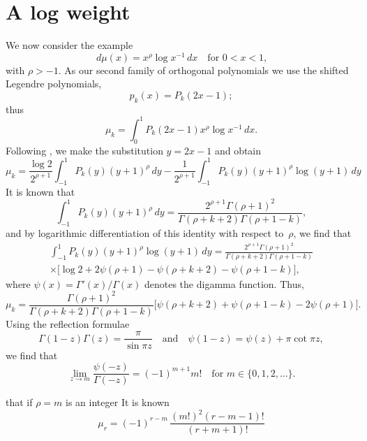 \documentclass[12pt,a4paper]{article}
\begin{document}
\section{A log weight}
We now consider the example
\[
d\mu(x)=x^\rho\log x^{-1}\,dx\quad\text{for $0<x<1$,}
\]
with $\rho>-1$.  As our second family of orthogonal polynomials we 
use the shifted Legendre polynomials,
\[
p_k(x)=P_k(2x-1);
\]
thus
\[
\mu_k=\int_0^1 P_k(2x-1)x^\rho\log x^{-1}\,dx.
\]
Following \cite{Gautschi1979}, we make the substitution $y=2x-1$
and obtain
\[
\mu_k=\frac{\log 2}{2^{\rho+1}}\int_{-1}^1 P_k(y)(y+1)^\rho\,dy
	-\frac{1}{2^{\rho+1}}\int_{-1}^1 
		P_k(y)(y+1)^\rho\log(y+1)\,dy
\]
It is known that
\[
\int_{-1}^1 P_k(y)(y+1)^\rho\,dy
	=\frac{2^{\rho+1}\Gamma(\rho+1)^2}%
{\Gamma(\rho+k+2)\Gamma(\rho+1-k)},
\]
and by logarithmic differentiation of this identity with respect 
to~$\rho$, we find that
\begin{multline*}
\int_{-1}^1 P_k(y)(y+1)^\rho\log(y+1)\,dy
	=\frac{2^{\rho+1}\Gamma(\rho+1)^2}%
{\Gamma(\rho+k+2)\Gamma(\rho+1-k)}\\
	\times\bigl[\log2+2\psi(\rho+1)-\psi(\rho+k+2)-\psi(\rho+1-k)
	\bigr],
\end{multline*}
where $\psi(x)=\Gamma'(x)/\Gamma(x)$ denotes the digamma function.
Thus,
\[
\mu_k=\frac{\Gamma(\rho+1)^2}{\Gamma(\rho+k+2)\Gamma(\rho+1-k)}
	\bigl[\psi(\rho+k+2)+\psi(\rho+1-k)-2\psi(\rho+1)\bigr].
\]
Using the reflection formulae
\[
\Gamma(1-z)\Gamma(z)=\frac{\pi}{\sin\pi z}
\quad\text{and}\quad
\psi(1-z)=\psi(z)+\pi\cot\pi z,
\]
we find that
\[
\lim_{z\to m}\frac{\psi(-z)}{\Gamma(-z)}=(-1)^{m+1}m!
\quad\text{for $m\in\{0,1,2,\dots\}$.}
\]




that if $\rho=m$ is an integer
It is known~
\[
\mu_r=(-1)^{r-m}\,\frac{(m!)^2(r-m-1)!}{(r+m+1)!}
\]









\end{document}
